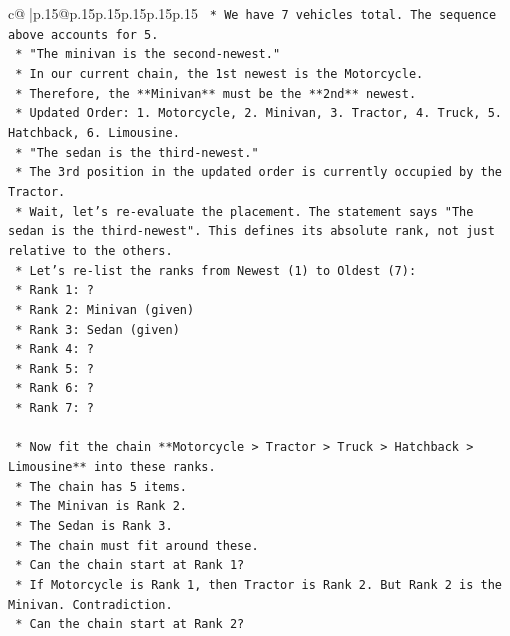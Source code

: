 \documentclass{article}
\begin{document}
{\begin{supertabular}{c@{$\;$}|p{.15\linewidth}@{}p{.15\linewidth}p{.15\linewidth}p{.15\linewidth}p{.15\linewidth}p{.15\linewidth}}
{{{\texttt{    *   We have 7 vehicles total. The sequence above accounts for 5.} \\
\texttt{    *   "The minivan is the second{-}newest."} \\
\texttt{        *   In our current chain, the 1st newest is the Motorcycle.} \\
\texttt{        *   Therefore, the **Minivan** must be the **2nd** newest.} \\
\texttt{        *   Updated Order: 1. Motorcycle, 2. Minivan, 3. Tractor, 4. Truck, 5. Hatchback, 6. Limousine.} \\
\texttt{    *   "The sedan is the third{-}newest."} \\
\texttt{        *   The 3rd position in the updated order is currently occupied by the Tractor.} \\
\texttt{        *   Wait, let's re{-}evaluate the placement. The statement says "The sedan is the third{-}newest". This defines its absolute rank, not just relative to the others.} \\
\texttt{        *   Let's re{-}list the ranks from Newest (1) to Oldest (7):} \\
\texttt{            *   Rank 1: ?} \\
\texttt{            *   Rank 2: Minivan (given)} \\
\texttt{            *   Rank 3: Sedan (given)} \\
\texttt{            *   Rank 4: ?} \\
\texttt{            *   Rank 5: ?} \\
\texttt{            *   Rank 6: ?} \\
\texttt{            *   Rank 7: ?} \\
\\ 
\texttt{    *   Now fit the chain **Motorcycle > Tractor > Truck > Hatchback > Limousine** into these ranks.} \\
\texttt{        *   The chain has 5 items.} \\
\texttt{        *   The Minivan is Rank 2.} \\
\texttt{        *   The Sedan is Rank 3.} \\
\texttt{        *   The chain must fit around these.} \\
\texttt{        *   Can the chain start at Rank 1?} \\
\texttt{            *   If Motorcycle is Rank 1, then Tractor is Rank 2. But Rank 2 is the Minivan. Contradiction.} \\
\texttt{        *   Can the chain start at Rank 2?} \\
}}}
\end{supertabular}}
\end{document}
